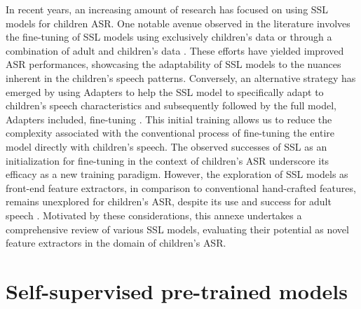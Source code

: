 In recent years, an increasing amount of research has focused on using \ac{SSL} models for children \ac{ASR}. One notable avenue observed in the literature involves the fine-tuning of \ac{SSL} models using exclusively children's data \cite{jain2023adaptation} or through a combination of adult and children's data \cite{jain2023wav2vec2}. These efforts have yielded improved \ac{ASR} performances, showcasing the adaptability of \ac{SSL} models to the nuances inherent in the children's speech patterns. Conversely, an alternative strategy has emerged by using Adapters to help the \ac{SSL} model to specifically adapt to children's speech characteristics and subsequently followed by the full model, Adapters included, fine-tuning \cite{fan2022draft}. This initial training allows us to reduce the complexity associated with the conventional process of fine-tuning the entire model directly with children's speech.
The observed successes of \ac{SSL} as an initialization for fine-tuning in the context of children's \ac{ASR} underscore its efficacy as a new training paradigm. However, the exploration of \ac{SSL} models as front-end feature extractors, in comparison to conventional hand-crafted features, remains unexplored for children's \ac{ASR}, despite its use and success for adult speech \cite{yang21c_interspeech,chang2021exploration}. Motivated by these considerations, this annexe undertakes a comprehensive review of various \ac{SSL} models, evaluating their potential as novel feature extractors in the domain of children's \ac{ASR}.
\section{Self-supervised pre-trained models}

